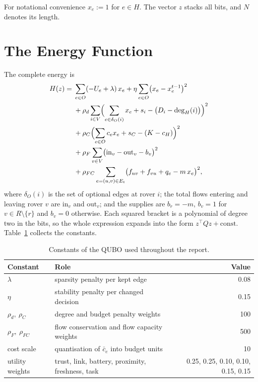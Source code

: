 For notational convenience $x_e:=1$ for $e\in H$. The vector $z$ stacks all
bits, and $N$ denotes its length.

\section{The Energy Function}

The complete energy is
\begin{align}
H(z) ={}& \sum_{e\in O}(-U_e+\lambda)\,x_e
 + \eta\sum_{e\in O}\bigl(x_e-x_e^{t-1}\bigr)^2 \notag\\
&+ \rho_d\sum_{i\in V}\Bigl(\sum_{e\in\delta_O(i)}x_e+s_i-\bigl(D_i-\deg_H(i)\bigr)\Bigr)^2 \notag\\
&+ \rho_C\Bigl(\sum_{e\in O}c_ex_e+s_C-(K-c_H)\Bigr)^2 \notag\\
&+ \rho_F\sum_{v\in V}\bigl(\mathrm{in}_v-\mathrm{out}_v-b_v\bigr)^2 \notag\\
&+ \rho_{FC}\sum_{e=(u,v)\in E_t}\bigl(f_{uv}+f_{vu}+q_e-m\,x_e\bigr)^2,
\label{eq:qubo:energy}
\end{align}
where $\delta_O(i)$ is the set of optional edges at rover $i$; the total flows
entering and leaving rover $v$ are $\mathrm{in}_v$ and $\mathrm{out}_v$; and
the supplies are $b_r=-m$, $b_v=1$ for $v\in R\setminus\{r\}$ and
$b_v=0$ otherwise. Each squared bracket is a polynomial of degree two in the
bits, so the whole expression expands into the form $z^{\top}Qz+\mathrm{const}$.
Table~\ref{tab:qubo:consts} collects the constants.

\begin{table}[htbp]
\centering
\caption{Constants of the QUBO used throughout the report.}
\label{tab:qubo:consts}
\small
\begin{tabularx}{\linewidth}{@{}l X r@{}}
\toprule
Constant & Role & Value \\
\midrule
$\lambda$ & sparsity penalty per kept edge & 0.08 \\
$\eta$ & stability penalty per changed decision & 0.15 \\
$\rho_d,\ \rho_C$ & degree and budget penalty weights & 100 \\
$\rho_F,\ \rho_{FC}$ & flow conservation and flow capacity weights & 500 \\
cost scale & quantisation of $\bar c_e$ into budget units & 10 \\
utility weights & trust, link, battery, proximity, freshness, task & 0.25, 0.25, 0.10, 0.10, 0.15, 0.15 \\
\bottomrule
\end{tabularx}
\end{table}

